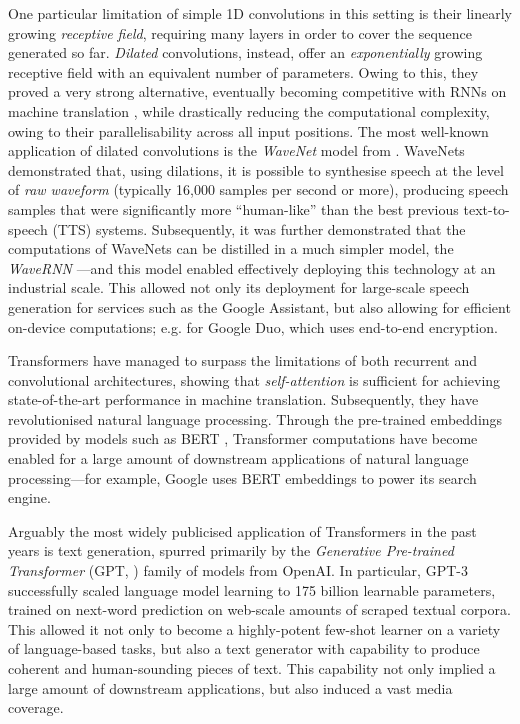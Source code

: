One particular limitation of simple 1D convolutions in this setting is their linearly growing \emph{receptive field}, requiring many layers in order to cover the sequence generated so far. \emph{Dilated} convolutions, instead, offer an \emph{exponentially} growing receptive field with an equivalent number of parameters. Owing to this, they proved a very strong alternative, eventually becoming competitive with RNNs on machine translation \citep{kalchbrenner2016neural}, while drastically reducing the computational complexity, owing to their parallelisability across all input positions. The most well-known application of dilated convolutions is the \emph{WaveNet} model from \cite{oord2016wavenet}. WaveNets demonstrated that, using dilations, it is possible to synthesise speech at the level of \emph{raw waveform} (typically 16,000 samples per second or more), producing speech samples that were significantly more ``human-like'' than the best previous text-to-speech (TTS) systems. Subsequently, it was further demonstrated that the computations of WaveNets can be distilled in a much simpler model, the \emph{WaveRNN} \citep{kalchbrenner2018efficient}---and this model enabled effectively deploying this technology at an industrial scale. This allowed not only its deployment for large-scale speech generation for services such as the Google Assistant, but also allowing for efficient on-device computations; e.g. for Google Duo, which uses end-to-end encryption.

Transformers \citep{vaswani2017attention} have managed to surpass the limitations of both recurrent and convolutional architectures, showing that \emph{self-attention} is sufficient for achieving state-of-the-art performance in machine translation. Subsequently, they have revolutionised natural language processing. Through the pre-trained embeddings provided by models such as BERT \citep{devlin2018bert}, Transformer computations have become enabled for a large amount of downstream applications of natural language processing---for example, Google uses BERT embeddings to power its search engine. 

Arguably the most widely publicised application of Transformers in the past years is text generation, spurred primarily by the \emph{Generative Pre-trained Transformer} (GPT, \cite{radford2018improving,radford2019language,brown2020language}) family of models from OpenAI. In particular, GPT-3 \citep{brown2020language} successfully scaled language model learning to 175 billion learnable parameters, trained on next-word prediction on web-scale amounts of scraped textual corpora. This allowed it not only to become a highly-potent few-shot learner on a variety of language-based tasks, but also a text generator with capability to produce coherent and human-sounding pieces of text. This capability not only implied a large amount of downstream applications, but also induced a vast media coverage.

